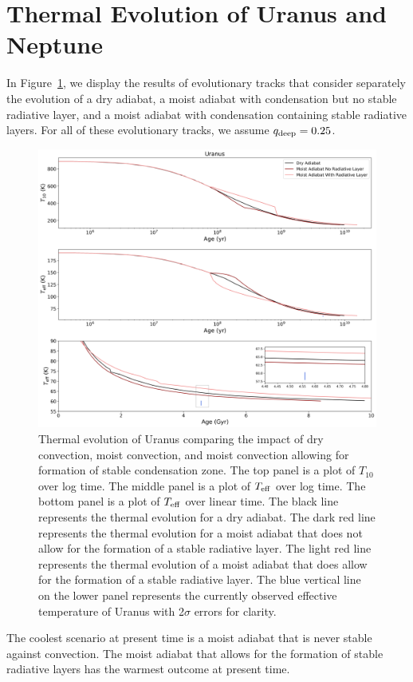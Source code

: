 \documentclass[11pt]{ucscthesisbs}
\begin{document}
\section{Thermal Evolution of Uranus and Neptune}

In Figure~\ref{fig:evolve_adiabats}, we display the results of evolutionary tracks that consider separately the evolution of a dry adiabat, a moist adiabat with condensation but no stable radiative layer, and a moist adiabat with condensation containing stable radiative layers. For all of these evolutionary tracks, we assume $q_{\rm deep} = 0.25$. 
\begin{figure}[h]
 \centerline{
  \includegraphics[width=\columnwidth]{figures/dry_moist_radiative_u_cooling_curves_adiabat_comparisons.png}
 }
\caption[Thermal Evolution Curves for Uranus - Adiabat Comparisons]
{Thermal evolution of Uranus comparing the impact of dry convection, moist convection, and moist convection allowing for formation of stable condensation zone. The top panel is a plot of $T_{10}$ over log time. The middle panel is a plot of $T_{\rm eff}$ over log time. The bottom panel is a plot of $T_{\rm eff}$ over linear time. The black line represents the thermal evolution for a dry adiabat. The dark red line represents the thermal evolution for a moist adiabat that does not allow for the formation of a stable radiative layer. The light red line represents the thermal evolution of a moist adiabat that does allow for the formation of a stable radiative layer. The blue vertical line on the lower panel represents the currently observed effective temperature of Uranus with 2$\sigma$ errors for clarity. }
\label{fig:evolve_adiabats}
\end{figure}
The coolest scenario at present time is a moist adiabat that is never stable against convection. The moist adiabat that allows for the formation of stable radiative layers has the warmest outcome at present time. 
\end{document}
